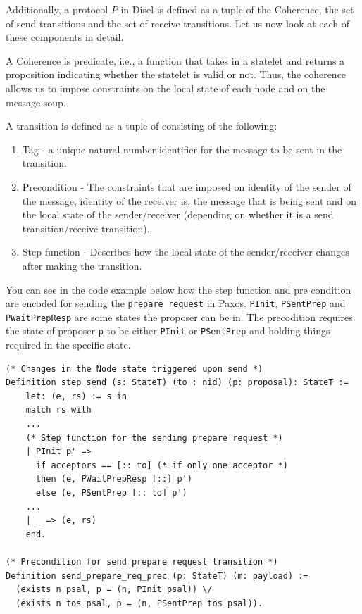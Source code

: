Additionally, a protocol $P$ in Disel is defined as a tuple
of the \textsf{Coherence}, the set of send transitions and the set of receive transitions.
Let us now look at each of these components in detail.

A \textsf{Coherence} is predicate, i.e., a function that takes in a statelet and returns a proposition
indicating whether the statelet is valid or not. Thus, the coherence allows us
to impose constraints on the local state of each node and on the message soup.

A transition is defined as a tuple of consisting of the following:
\begin{enumerate}
  \item Tag - a unique natural number identifier for the message to be sent in the transition.
  \item Precondition - The constraints that are imposed on identity of the sender of the message,
    identity of the receiver is, the message that is being sent and on the local state of
    the sender/receiver (depending on whether it is a send transition/receive transition).
  \item Step function - Describes how the local state of the sender/receiver changes after
    making the transition.
\end{enumerate}

You can see in the code example below how the step function and pre condition
are encoded for sending the \texttt{prepare request} in Paxos. \texttt{PInit},
\texttt{PSentPrep} and \texttt{PWaitPrepResp} are some states the
proposer can be in. The precodition requires the state of proposer \texttt{p}
to be either \texttt{PInit} or \texttt{PSentPrep} and holding things required
in the specific state.

\begin{lstlisting}
(* Changes in the Node state triggered upon send *)
Definition step_send (s: StateT) (to : nid) (p: proposal): StateT :=
    let: (e, rs) := s in
    match rs with
    ...
    (* Step function for the sending prepare request *)
    | PInit p' =>
      if acceptors == [:: to] (* if only one acceptor *)
      then (e, PWaitPrepResp [::] p')
      else (e, PSentPrep [:: to] p')
    ...
    | _ => (e, rs)
    end.

(* Precondition for send prepare request transition *)
Definition send_prepare_req_prec (p: StateT) (m: payload) :=
  (exists n psal, p = (n, PInit psal)) \/
  (exists n tos psal, p = (n, PSentPrep tos psal)).
\end{lstlisting}

